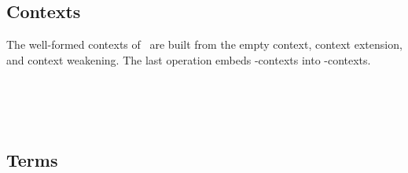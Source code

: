 \subsection{Contexts}
The well-formed contexts of \GTT\ are built from the empty context, context extension, and context weakening. The last operation embeds -contexts into -contexts.
\begin{AgdaAlign}
\begin{code}%
\>[0]\AgdaSpace{}%
\AgdaSpace{}%
\AgdaSymbol{:}\AgdaSpace{}%
\AgdaSpace{}%
\AgdaSpace{}%
\AgdaSpace{}%
\<%
\\
\>[0][@{}l@{\AgdaIndent{0}}]%
\>[2]\AgdaSpace{}%
\AgdaSymbol{:}\AgdaSpace{}%
\AgdaSpace{}%
\AgdaSymbol{\{}\AgdaSymbol{\}}\AgdaSpace{}%
\AgdaSpace{}%
\AgdaSpace{}%
\<%
\\
%
\>[2]\AgdaOperator{\AgdaInductiveConstructor{\AgdaUnderscore{},\AgdaUnderscore{}}}\AgdaSpace{}%
\AgdaSymbol{:}\AgdaSpace{}%
\AgdaSpace{}%
\AgdaSymbol{\{}\AgdaSymbol{\}}\AgdaSpace{}%
\AgdaSpace{}%
\AgdaSpace{}%
\AgdaSpace{}%
\AgdaSpace{}%
\AgdaSpace{}%
\AgdaSpace{}%
\AgdaSpace{}%
\AgdaSpace{}%
\<%
\\
%
\>[2]\AgdaSpace{}%
\AgdaSymbol{:}\AgdaSpace{}%
\AgdaSpace{}%
\AgdaSpace{}%
\AgdaSpace{}%
\AgdaSpace{}%
\<%
\end{code}
\end{AgdaAlign}


\subsection{Terms}

